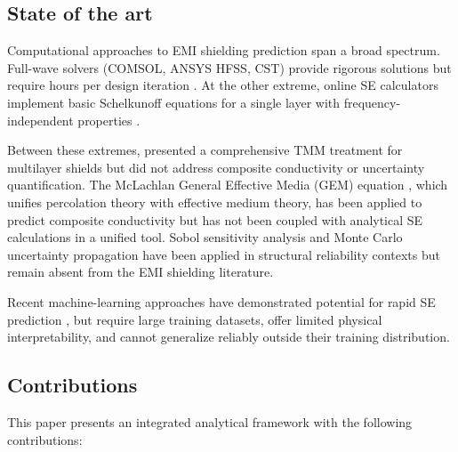 \documentclass[review,3p,authoryear]{elsarticle}
\begin{document}
\subsection{State of the art}

Computational approaches to EMI shielding prediction span a broad spectrum. Full-wave solvers (COMSOL, ANSYS HFSS, CST) provide rigorous solutions but require hours per design iteration \citep{Pozar2011}. At the other extreme, online SE calculators implement basic Schelkunoff equations for a single layer with frequency-independent properties \citep{Chung2001}.

Between these extremes, \citet{Celozzi2008} presented a comprehensive TMM treatment for multilayer shields but did not address composite conductivity or uncertainty quantification. The McLachlan General Effective Media (GEM) equation \citep{McLachlan1990}, which unifies percolation theory with effective medium theory, has been applied to predict composite conductivity \citep{Bauhofer2009, Iqbal2020} but has not been coupled with analytical SE calculations in a unified tool. Sobol sensitivity analysis \citep{Sobol2001} and Monte Carlo uncertainty propagation \citep{McKay1979} have been applied in structural reliability contexts but remain absent from the EMI shielding literature.

Recent machine-learning approaches have demonstrated potential for rapid SE prediction \citep{Cao2020, Han2020}, but require large training datasets, offer limited physical interpretability, and cannot generalize reliably outside their training distribution.

\subsection{Contributions}

This paper presents an integrated analytical framework with the following contributions:
\end{document}
